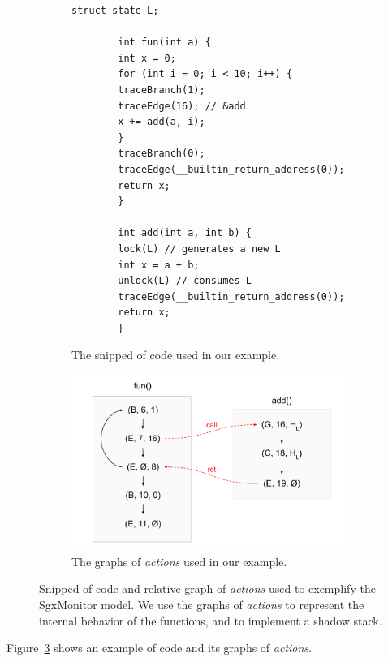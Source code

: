 \begin{figure}[t]
	\centering
	\begin{subfigure}[b]{0.45\textwidth}
		\centering
		\begin{lstlisting}[style=CStyle,escapechar=|,basicstyle=\ttfamily\tiny]
		struct state L;
		
		int fun(int a) {
		int x = 0;
		for (int i = 0; i < 10; i++) {
		traceBranch(1);
		traceEdge(16); // &add
		x += add(a, i);
		}
		traceBranch(0);
		traceEdge(__builtin_return_address(0));
		return x;
		}
		
		int add(int a, int b) {
		lock(L) // generates a new L
		int x = a + b;
		unlock(L) // consumes L
		traceEdge(__builtin_return_address(0));
		return x;
		}
		\end{lstlisting}
		\caption{The snipped of code used in our example.}
		\label{fig:running-example-code}
	\end{subfigure}
	\hfill
	\begin{subfigure}[b]{0.45\textwidth}
		\centering
		\includegraphics[width=\textwidth]{fig_c6/running-example-graph.pdf}
		\caption{The graphs of \emph{actions} used in our example.}
		\label{fig:running-example-graph}
	\end{subfigure}
	\caption[SgxMonitor running example.]{Snipped of code and relative graph of 
	\emph{actions} used to exemplify the SgxMonitor model. We use the graphs of 
	\emph{actions} to represent the internal behavior of the functions, and to 
	implement a shadow stack.}
	\label{fig:running-example}
\end{figure}

Figure~\ref{fig:running-example} shows an example of code and its graphs 
of \emph{actions}.

